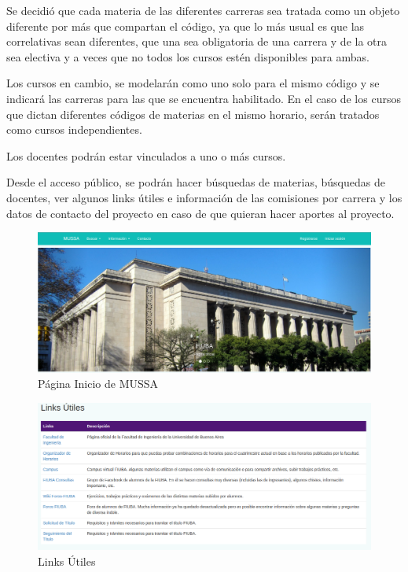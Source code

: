 \documentclass[a4paper]{article}
\begin{document}
Se decidió que cada materia de las diferentes carreras sea tratada como un objeto diferente por más que compartan el código, ya que lo más usual es que las correlativas sean diferentes, que una sea obligatoria de una carrera y de la otra sea electiva y a veces que no todos los cursos estén disponibles para ambas.

Los cursos en cambio, se modelarán como uno solo para el mismo código y se indicará las carreras para las que se encuentra habilitado. En el caso de los cursos que dictan diferentes códigos de materias en el mismo horario, serán tratados como cursos independientes.

Los docentes podrán estar vinculados a uno o más cursos.\newline

Desde el acceso público, se podrán hacer búsquedas de materias, búsquedas de docentes, ver algunos links útiles e información de las comisiones por carrera y los datos de contacto del proyecto en caso de que quieran hacer aportes al proyecto.\newline

\begin{figure}[H]
\centering
\includegraphics[scale=0.25]{Imagenes/pagina_inicio.png}\par
\caption{Página Inicio de MUSSA}
\end{figure}

\begin{figure}[H]
\centering
\includegraphics[scale=0.3]{Imagenes/links_utiles.png}\par
\caption{Links Útiles}
\end{figure}
\end{document}
